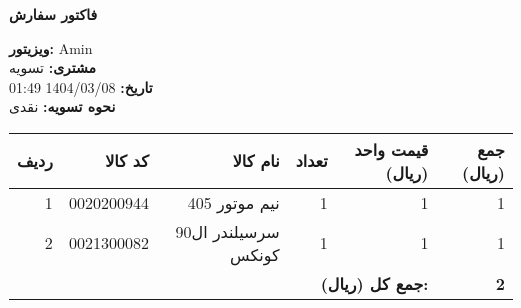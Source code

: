 \documentclass[a4paper,12pt]{article}
\begin{document}
        \begin{center}
            \textbf{\Large فاکتور سفارش}
        \end{center}
        \vspace{0.5cm}
        \begin{flushright}
            \textbf{ویزیتور:} Amin \\
            \textbf{مشتری:} تسویه \\
            \textbf{تاریخ:} 1404/03/08 01:49 \\
            \textbf{نحوه تسویه:} نقدی
        \end{flushright}
        \vspace{0.5cm}
        \begin{longtable}{|r|r|r|r|r|r|}
            \hline
            \textbf{ردیف} & \textbf{کد کالا} & \textbf{نام کالا} & \textbf{تعداد} & \textbf{قیمت واحد (ریال)} & \textbf{جمع (ریال)} \\
            \hline
            \endhead
                    1 & 0020200944 & نيم موتور 405 & 1 & 1 & 1 \\
            \hline
            2 & 0021300082 & سرسيلندر ال90 کونکس & 1 & 1 & 1 \\
            \hline

            \hline
            \multicolumn{5}{|r|}{\textbf{جمع کل (ریال):}} & \textbf{ 2 } \\
            \hline
        \end{longtable}
        
\end{document}
